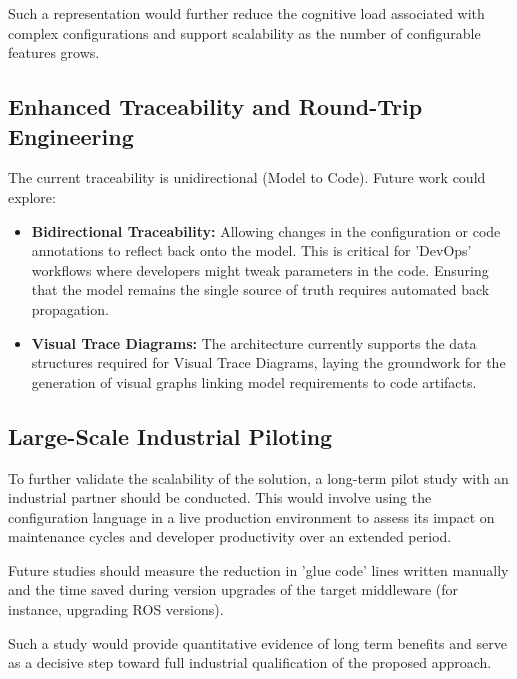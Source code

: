 Such a representation would further reduce the cognitive load associated with complex configurations and support scalability as the number of configurable features grows.



\subsection{Enhanced Traceability and Round-Trip Engineering}
\label{sec:concl_trace}

The current traceability is unidirectional (Model to Code). Future work could explore:

\begin{itemize} 
	\item \textbf{Bidirectional Traceability: } Allowing changes in the configuration or code annotations to reflect back onto the model. This is critical for 'DevOps' workflows where developers might tweak parameters in the code. Ensuring that the model remains the single source of truth requires automated back propagation.
	
	\item \textbf{Visual Trace Diagrams: } The architecture currently supports the data structures required for Visual Trace Diagrams, laying the groundwork for the generation of visual graphs linking model requirements to code artifacts. 
\end{itemize}



\subsection{Large-Scale Industrial Piloting}
\label{sec:concl_industrial_piloting}

To further validate the scalability of the solution, a long-term pilot study with an industrial partner should be conducted. This would involve using the configuration language in a live production environment to assess its impact on maintenance cycles and developer productivity over an extended period.

Future studies should measure the reduction in 'glue code' lines written manually and the time saved during version upgrades of the target middleware (for instance, upgrading \gls{ROS} versions).

Such a study would provide quantitative evidence of long term benefits and serve as a decisive step toward full industrial qualification of the proposed approach.







